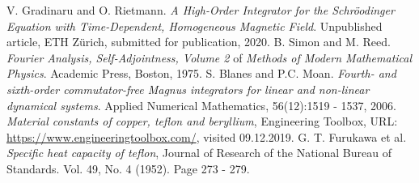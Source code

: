 \documentclass{article}
\begin{document}
\begin{thebibliography}{9}
  V. Gradinaru and O. Rietmann.
  \textit{A High-Order Integrator for the
          Schr{\"o}odinger Equation with Time-Dependent,
          Homogeneous Magnetic Field}.
  Unpublished article, ETH Z{\"u}rich, submitted for publication, 2020.
  B. Simon and M. Reed.
  \textit{Fourier Analysis, Self-Adjointness, Volume 2} of \textit{Methods of Modern Mathematical Physics}.
  Academic Press, Boston, 1975.
  S. Blanes and P.C. Moan.
  \textit{Fourth- and sixth-order commutator-free Magnus integrators for linear and non-linear dynamical systems}.
  Applied Numerical Mathematics, 56(12):1519 - 1537, 2006.
  \textit{Material constants of copper, teflon and beryllium},
  Engineering Toolbox, URL: \url{https://www.engineeringtoolbox.com/}, visited 09.12.2019.
  G. T. Furukawa et al.
  \textit{Specific heat capacity of teflon},
  Journal of Research of the National Bureau of Standards. Vol. 49, No. 4 (1952). Page 273 - 279.


\end{thebibliography}
\end{document}
